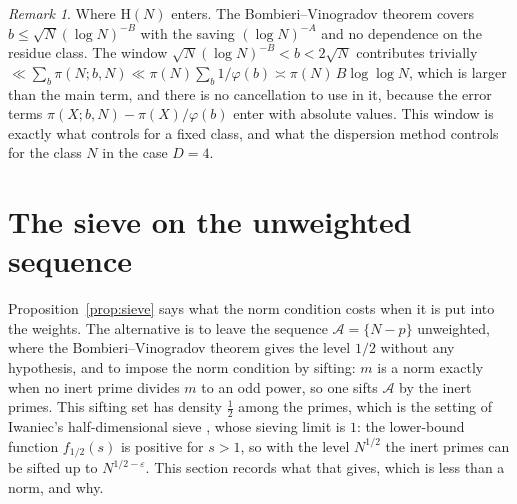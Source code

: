 \documentclass[11pt]{amsart}
\theoremstyle{definition}
\theoremstyle{remark}
\newtheorem{remark}[theorem]{Remark}
\newcommand{\e}{\varepsilon}
\begin{document}
\begin{remark}
Where $\mathrm H(N)$ enters. The Bombieri--Vinogradov theorem covers $b\le\sqrt N(\log N)^{-B}$ with the saving $(\log N)^{-A}$ and no dependence on the residue class. The window $\sqrt N(\log N)^{-B}<b<2\sqrt N$ contributes trivially $\ll\sum_b\pi(N;b,N)\ll\pi(N)\sum_b1/\varphi(b)\asymp\pi(N)\,B\log\log N$, which is larger than the main term, and there is no cancellation to use in it, because the error terms $\pi(X;b,N)-\pi(X)/\varphi(b)$ enter with absolute values. This window is exactly what \cite{BFI89} controls for a fixed class, and what the dispersion method controls for the class $N$ in the case $D=4$.
\end{remark}

\section{The sieve on the unweighted sequence}\label{sec:mixed}

Proposition~\ref{prop:sieve} says what the norm condition costs when it is put into the weights. The alternative is to leave the sequence $\mathcal A=\{N-p\}$ unweighted, where the Bombieri--Vinogradov theorem gives the level $1/2$ without any hypothesis, and to impose the norm condition by sifting: $m$ is a norm exactly when no inert prime divides $m$ to an odd power, so one sifts $\mathcal A$ by the inert primes. This sifting set has density $\frac12$ among the primes, which is the setting of Iwaniec's half-dimensional sieve \cite{Iwaniec76}, whose sieving limit is $1$: the lower-bound function $f_{1/2}(s)$ is positive for $s>1$, so with the level $N^{1/2}$ the inert primes can be sifted up to $N^{1/2-\e}$. This section records what that gives, which is less than a norm, and why.
\end{document}
